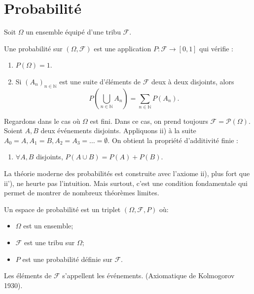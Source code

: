 \section{Probabilité}
Soit $\Omega$ un ensemble équipé d'une tribu $\mathcal{F}$.
\begin{definition}[Probabilité]
Une probabilité sur $(\Omega, \mathcal{F})$ est une application $P: \mathcal{F} \to [0,1]$ qui vérifie :
\begin{enumerate}
    \item[i)] $P(\Omega) = 1$.
    \item[ii)] Si $(A_n)_{n \in \mathbb{N}}$ est une suite d'éléments de $\mathcal{F}$ deux à deux disjoints, alors
    \[
        P\left(\bigcup_{n \in \mathbb{N}} A_n\right) = \sum_{n \in \mathbb{N}} P(A_n).
    \]
\end{enumerate}
\end{definition}
Regardons dans le cas où $\Omega$ est fini. Dans ce cas, on prend toujours $\mathcal{F} = \mathcal{P}(\Omega)$. Soient $A, B$ deux événements disjoints. Appliquons ii) à la suite $A_0 = A, A_1=B, A_2=A_3=\dots=\emptyset$. On obtient la propriété d'additivité finie :
\begin{enumerate}
    \item[ii')] $\forall A, B$ disjoints, $P(A \cup B) = P(A) + P(B)$.
\end{enumerate}
La théorie moderne des probabilités est construite avec l'axiome ii), plus fort que ii'), ne heurte pas l'intuition. Mais surtout, c'est une condition fondamentale qui permet de montrer de nombreux théorèmes limites.
\begin{definition}
Un espace de probabilité est un triplet $(\Omega, \mathcal{F}, P)$ où:
\begin{itemize}
    \item $\Omega$ est un ensemble;
    \item $\mathcal{F}$ est une tribu sur $\Omega$;
    \item $P$ est une probabilité définie sur $\mathcal{F}$.
\end{itemize}
Les éléments de $\mathcal{F}$ s'appellent les événements. (Axiomatique de Kolmogorov 1930).
\end{definition}
